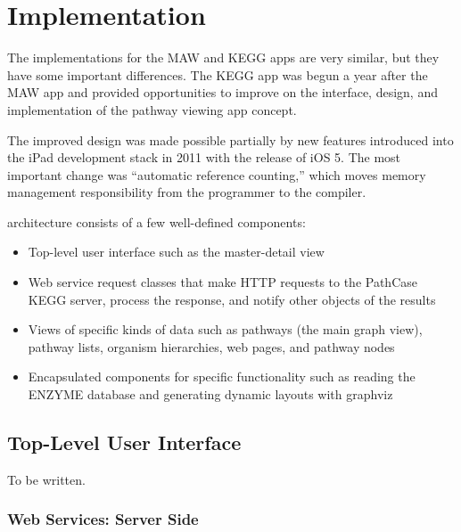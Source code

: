 \section{Implementation}
\label{sect:kegg_implementation}

The implementations for the MAW and KEGG apps are very similar, but they have
some important differences. The KEGG app was begun a year after the MAW app and
provided opportunities to improve on the interface, design, and implementation
of the pathway viewing app concept.

The improved design was made possible partially by new features introduced into
the iPad development stack in 2011 with the release of iOS 5. The most important
change was ``automatic reference counting,'' which moves memory management
responsibility from the programmer to the compiler. 

\keggappp architecture consists of a few well-defined components:

\begin{itemize}

    \item Top-level user interface such as the master-detail view
    
    \item Web service request classes that make HTTP requests to the PathCase
        KEGG server, process the response, and notify other objects of the
        results

    \item Views of specific kinds of data such as pathways (the main graph
        view), pathway lists, organism hierarchies, web pages, and pathway nodes

    \item Encapsulated components for specific functionality such as reading the
        ENZYME database and generating dynamic layouts with graphviz

\end{itemize}

\subsection{Top-Level User Interface}
\label{sect:kegg_impl_top_level_ui}

To be written.

\subsubsection{Web Services: Server Side}


